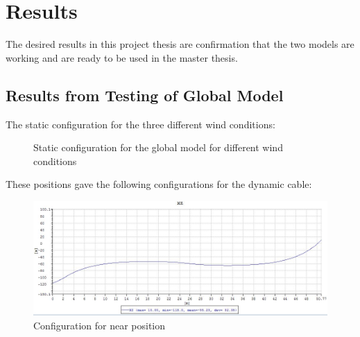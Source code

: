 \chapter{Results}
\label{chap:results}
The desired results in this project thesis are confirmation that the two models are working and are ready to be used in the master thesis. 
\section{Results from Testing of Global Model}
The static configuration for the three different wind conditions: 
\begin{figure}[H]
\hfill
{}\hfill
  \hfill
\caption{Static configuration for the global model for different wind conditions}
\label{fig:statcon}
\end{figure}

\noindent These positions gave the following configurations for the dynamic cable: 
\begin{figure}[H]
\centering
\includegraphics[scale=0.5]{figures/confignear}
\caption{Configuration for near position}
 \label{fig:confignear}
\end{figure}


